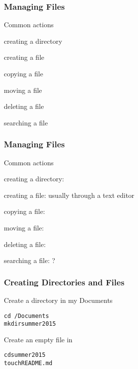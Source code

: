 \documentclass[12pt]{beamer}\usepackage[]{graphicx}\usepackage[]{color}
\makeatletter
\newenvironment{kframe}{%
 \def\at@end@of@kframe{}%
 \ifinner\ifhmode%
  \def\at@end@of@kframe{\end{minipage}}%
  \begin{minipage}{\columnwidth}%
 \fi\fi%
 \def\FrameCommand##1{\hskip\@totalleftmargin \hskip-\fboxsep
 \colorbox{shadecolor}{##1}\hskip-\fboxsep
     \hskip-\linewidth \hskip-\@totalleftmargin \hskip\columnwidth}%
 \MakeFramed {\advance\hsize-\width
   \@totalleftmargin\z@ \linewidth\hsize
   \@setminipage}}%
 {\par\unskip\endMakeFramed%
 \at@end@of@kframe}
\newenvironment{knitrout}{}{} %
\makeatother
\begin{document}

\begin{frame}
\begin{center}
\Huge{}
\end{center}
\end{frame}


\begin{frame}
\frametitle{Managing Files}
Common actions
\bi
  \item creating a directory
  \item creating a file
  \item copying a file
  \item moving a file
  \item deleting a file
  \item searching a file
\ei
\end{frame}


\begin{frame}
\frametitle{Managing Files}
Common actions
\bi
  \item creating a directory: 
  \item creating a file: usually through a text editor
  \item copying a file: 
  \item moving a file: 
  \item deleting a file: 
  \item searching a file: ?
\ei
\end{frame}


\begin{frame}[fragile]
\frametitle{Creating Directories and Files}

Create a directory  in my Documents
\begin{knitrout}\footnotesize
{}\color{fgcolor}\begin{kframe}
\begin{alltt}
cd ~/Documents
mkdir summer2015
\end{alltt}
\end{kframe}
\end{knitrout}

\bigskip
Create an empty file  in 
\begin{knitrout}\footnotesize
{}\color{fgcolor}\begin{kframe}
\begin{alltt}
cd summer2015
touch README.md
\end{alltt}
\end{kframe}
\end{knitrout}

\end{frame}
\end{document}
